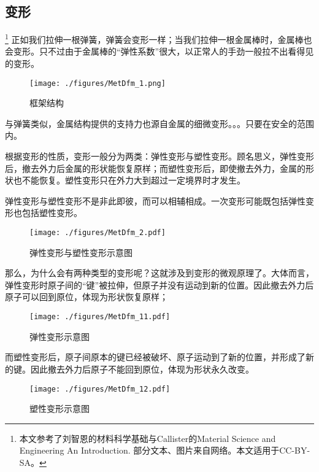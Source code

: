 

\subsection{变形}
\footnote{本文参考了刘智恩的材料科学基础与Callister的Material Science and Engineering An Introduction. 部分文本、图片来自网络。本文适用于CC-BY-SA。}
正如我们拉伸一根弹簧，弹簧会变形一样；当我们拉伸一根金属棒时，金属棒也会变形。只不过由于金属棒的“弹性系数”很大，以正常人的手劲一般拉不出看得见的变形。

\begin{example}{}
\begin{figure}[ht]
\centering
\texttt{[image: ./figures/MetDfm\_1.png]}
\caption{框架结构} \label{MetDfm_fig1}
\end{figure}
与弹簧类似，金属结构提供的支持力也源自金属的细微变形。。。只要在安全的范围内。
\end{example}

根据变形的性质，变形一般分为两类：弹性变形与塑性变形。顾名思义，弹性变形后，撤去外力后金属的形状能恢复原样；而塑性变形后，即使撤去外力，金属的形状也不能恢复。塑性变形只在外力大到超过一定境界时才发生。

弹性变形与塑性变形不是非此即彼，而可以相辅相成。一次变形可能既包括弹性变形也包括塑性变形。

\begin{figure}[ht]
\centering
\texttt{[image: ./figures/MetDfm\_2.pdf]}
\caption{弹性变形与塑性变形示意图} \label{MetDfm_fig2}
\end{figure}

那么，为什么会有两种类型的变形呢？这就涉及到变形的微观原理了。大体而言，弹性变形时原子间的“键”被拉伸，但原子并没有运动到新的位置。因此撤去外力后原子可以回到原位，体现为形状恢复原样；
\begin{figure}[ht]
\centering
\texttt{[image: ./figures/MetDfm\_11.pdf]}
\caption{弹性变形示意图} \label{MetDfm_fig11}
\end{figure}
而塑性变形后，原子间原本的键已经被破坏、原子运动到了新的位置，并形成了新的键。因此撤去外力后原子不能回到原位，体现为形状永久改变。
\begin{figure}[ht]
\centering
\texttt{[image: ./figures/MetDfm\_12.pdf]}
\caption{塑性变形示意图} \label{MetDfm_fig12}
\end{figure}

